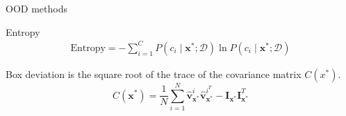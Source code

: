 \documentclass[10pt, aspectratio=169]{beamer}
\begin{document}
\begin{frame}[allowframebreaks]{OOD methods}
\begin{itemize}
\begin{itemize}
            Entropy
            \begin{equation}
                \label{Entropy}
                \begin{array}{l}
                    \text{Entropy} =-\sum_{i=1}^{C} P\left(c_i \mid \mathbf{x}^{*} ; \mathcal{D}\right) \ln P\left(c_i \mid \mathbf{x}^{*} ; \mathcal{D}\right) 
                \end{array}
            \end{equation} \newline

            Box deviation is the square root of the trace of the covariance matrix $C(x^{*})$.
            \begin{equation}
                C\left(\mathbf{x}^{*}\right)=\frac{1}{N} \sum_{i=1}^{N} \hat{\mathbf{v}}_{\mathbf{x}^{*}}^{i} \hat{\mathbf{v}}_{\mathbf{x}^{*}}^{i^{T}}-\mathbf{I}_{\mathbf{x}^{*}} \mathbf{I}_{\mathbf{x}^{*}}^{T}
            \end{equation}

        \end{itemize}
    \end{itemize}
\end{frame}
\end{document}
